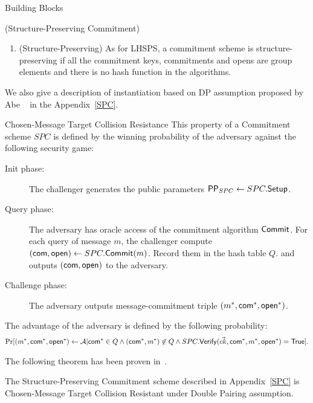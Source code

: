 \begin{subsection}{Building Blocks}
\begin{myDef}{(Structure-Preserving Commitment)}
\begin{enumerate}
      A commitment scheme is \resp perfect, statistical, computational hiding iff for all $\open$ and all messages $(x, x') \st x \neq x'$ the distribution $ComOpen(\PPP, \ck, \open, m)$ is \resp equal, statistically close, computationally close 
      
    \item (Structure-Preserving) As for LHSPS, a commitment scheme is structure-preserving if all the commitment keys, commitments and opens are group elements and there is no hash function in the algorithms. 
    \end{enumerate}
    
  \end{myDef}

  We also give a description of instantiation based on DP assumption proposed by Abe \etal~\cite{DBLP:conf/eurocrypt/AbeKOT15} in the Appendix~\ref{SPC}.

  
  \begin{myDef}{Chosen-Message Target Collision Resistance} This property of a Commitment scheme $SPC$ is defined by the winning probability of the adversary against the following security game:
    \begin{description}
    \item[Init phase:] The challenger generates the public parameters $\mathsf{PP}_{SPC} \gets SPC.{\mathsf{Setup}}$.
    \item[Query phase:] The adversary has oracle access of the commitment algorithm ${\mathsf{Commit}}$. For each query of message $m$, the challenger compute $(\mathsf{com}, \mathsf{open}) \gets SPC.{\mathsf{Commit}}(m)$. Record them in the hash table $Q$. and outputs $(\mathsf{com}, \mathsf{open})$ to the adversary.
    \item[Challenge phase:] The adversary outputs message-commitment triple $(m^*, \mathsf{com}^*, \mathsf{open}^*)$.
    \end{description}
    The advantage of the adversary is defined by the following probability:
    \begin{align*}
      \operatorname{Pr}[(m^*, \mathsf{com}^*, \mathsf{open}^*) \gets \mathcal{A} | \mathsf{com}^* \in Q \wedge (\mathsf{com}^*, m^*) \not \in Q \wedge SPC.{\mathsf{Verify}}(\vec{ck}, \mathsf{com}^*, m^*, \mathsf{open}^*) = \mathsf{True}].
    \end{align*}
  \end{myDef}

  The following theorem has been proven in~\cite{DBLP:conf/eurocrypt/AbeKOT15}.

  \begin{myTh}
    The Structure-Preserving Commitment scheme described in Appendix~\ref{SPC} is Chosen-Message Target Collision Resistant under Double Pairing assumption.
  \end{myTh}





\end{subsection}
